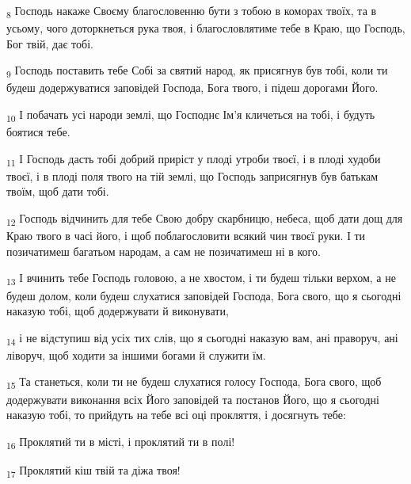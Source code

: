 \begin{tcolorbox}
\textsubscript{8} Господь накаже Своєму благословенню бути з тобою в коморах твоїх, та в усьому, чого доторкнеться рука твоя, і благословлятиме тебе в Краю, що Господь, Бог твій, дає тобі.
\end{tcolorbox}
\begin{tcolorbox}
\textsubscript{9} Господь поставить тебе Собі за святий народ, як присягнув був тобі, коли ти будеш додержуватися заповідей Господа, Бога твого, і підеш дорогами Його.
\end{tcolorbox}
\begin{tcolorbox}
\textsubscript{10} І побачать усі народи землі, що Господнє Ім'я кличеться на тобі, і будуть боятися тебе.
\end{tcolorbox}
\begin{tcolorbox}
\textsubscript{11} І Господь дасть тобі добрий приріст у плоді утроби твоєї, і в плоді худоби твоєї, і в плоді поля твого на тій землі, що Господь заприсягнув був батькам твоїм, щоб дати тобі.
\end{tcolorbox}
\begin{tcolorbox}
\textsubscript{12} Господь відчинить для тебе Свою добру скарбницю, небеса, щоб дати дощ для Краю твого в часі його, і щоб поблагословити всякий чин твоєї руки. І ти позичатимеш багатьом народам, а сам не позичатимеш ні в кого.
\end{tcolorbox}
\begin{tcolorbox}
\textsubscript{13} І вчинить тебе Господь головою, а не хвостом, і ти будеш тільки верхом, а не будеш долом, коли будеш слухатися заповідей Господа, Бога свого, що я сьогодні наказую тобі, щоб додержувати й виконувати,
\end{tcolorbox}
\begin{tcolorbox}
\textsubscript{14} і не відступиш від усіх тих слів, що я сьогодні наказую вам, ані праворуч, ані ліворуч, щоб ходити за іншими богами й служити їм.
\end{tcolorbox}
\begin{tcolorbox}
\textsubscript{15} Та станеться, коли ти не будеш слухатися голосу Господа, Бога свого, щоб додержувати виконання всіх Його заповідей та постанов Його, що я сьогодні наказую тобі, то прийдуть на тебе всі оці прокляття, і досягнуть тебе:
\end{tcolorbox}
\begin{tcolorbox}
\textsubscript{16} Проклятий ти в місті, і проклятий ти в полі!
\end{tcolorbox}
\begin{tcolorbox}
\textsubscript{17} Проклятий кіш твій та діжа твоя!
\end{tcolorbox}
